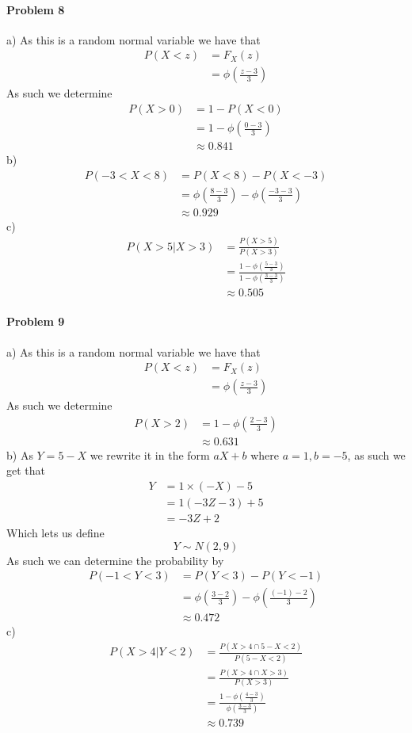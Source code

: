 \paragraph{Problem 8}
a)
As this is a random normal variable we have that
\begin{align*}
    P(X<z)&=F_{X}(z) \\
          &=\phi\left(\frac{z-3}{3}\right)
\end{align*}
As such we determine
\begin{align*}
    P(X>0)&=1-P(X<0) \\
          &=1-\phi\left(\frac{0-3}{3}\right) \\
          &\approx 0.841
\end{align*}
b)
\begin{align*}
    P(-3<X<8)&=P(X<8)-P(X<-3) \\
             &=\phi\left(\frac{8-3}{3}\right)-\phi\left(\frac{-3-3}{3}\right) \\
             &\approx 0.929
\end{align*}
c)
\begin{align*}
    P(X>5|X>3)&=\frac{P(X>5)}{P(X>3)} \\
              &=\frac{1-\phi\left(\frac{5-3}{3}\right)}{1-\phi\left(\frac{3-3}{3}\right)} \\
              &\approx 0.505
\end{align*}
\paragraph{Problem 9}
a)
As this is a random normal variable we have that
\begin{align*}
    P(X<z)&=F_{X}(z) \\
          &=\phi\left(\frac{z-3}{3}\right)
\end{align*}
As such we determine
\begin{align*}
    P(X>2)&=1-\phi\left(\frac{2-3}{3}\right) \\
          &\approx 0.631
\end{align*}
b)
As $Y=5-X$ we rewrite it in the form $aX+b$ where $a=1,b=-5$, as such we get that
\begin{align*}
    Y&=1\times (-X)-5 \\
     &=1(-3Z-3)+5 \\
     &=-3Z+2
\end{align*}
Which lets us define
\[
    Y\sim N(2,9)
\]
As such we can determine the probability by
\begin{align*}
    P(-1<Y<3)&=P(Y<3)-P(Y<-1) \\
             &=\phi\left(\frac{3-2}{3}\right)-\phi\left(\frac{(-1)-2}{3}\right) \\
             &\approx 0.472
\end{align*}
c)
\begin{align*}
    P(X>4|Y<2)&=\frac{P(X>4\cap 5-X<2)}{P(5-X<2)} \\
              &=\frac{P(X>4\cap X>3)}{P(X>3)} \\
              &=\frac{1-\phi\left(\frac{4-3}{3}\right)}{\phi\left(\frac{3-3}{3}\right)} \\
              &\approx 0.739
\end{align*}
